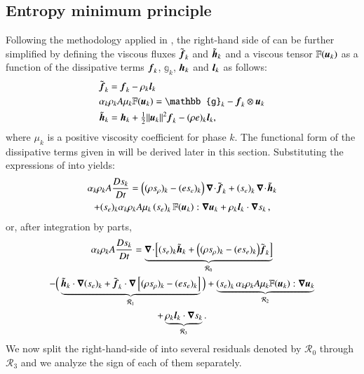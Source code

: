 \documentclass[preprint,10pt]{elsarticle}
\begin{document}
\subsection{Entropy minimum principle}\label{sct:end-min-pr}
%
Following the methodology applied in \cite{jlg, Marco_paper_low_mach}, the right-hand side of 
 can be further simplified by defining the viscous fluxes $\tilde{\boldsymbol f}_k$ and $\tilde{\boldsymbol h}_k$ and a viscous tensor  $\mathbb{F}(\boldsymbol u_k)$ as a function of the dissipative terms $\boldsymbol f_k$, $\mathbb{g}_k$, $\boldsymbol h_k$ and $\boldsymbol l_k$ as follows:
%
\begin{subequations}\label{eq:def-diss-terms-sect4}
\begin{align}
& \tilde{\mbold f}_k   =   \mbold f_k - \rho_k \mbold  l_k
  \\
&  \alpha_k \rho_k A \mu_k \mathbb{F}(\mbold u_k) =  \mathbb{g}_k -  \mbold f_k \otimes \mbold u_k
  \\
&  \tilde{\mbold h}_k =   \mbold h_k + \tfrac{1}{2}\| \mbold u_k\|^2  \mbold f_k - (\rho e)_k \mbold l_k,
\end{align}
\end{subequations}
%
where $\mu_k$ is a positive viscosity coefficient for phase $k$. The functional form of the dissipative terms given in  will be derived later in this section. Substituting the expressions of  into  yields:
%
\begin{multline}\label{eq:ent-res-7-eqn-diss-terms_rearranged2}
\alpha_k \rho_k A \frac{Ds_k}{Dt} 
=  \left( (\rho s_\rho)_k - (e s_e)_k \right) \boldsymbol\nabla\! \cdot \! \tilde{\boldsymbol f}_k 
+ \left(s_e\right)_k \boldsymbol\nabla\! \cdot \! \tilde{ \boldsymbol h} _k \\
+ (s_e)_k \alpha_k \rho_k A \mu_k  \left(s_e\right)_k \mathbb{F}(\boldsymbol u_k) : \boldsymbol\nabla \boldsymbol u_k 
+ \rho_k \boldsymbol l _k \cdot \boldsymbol\nabla s_k \,,
\end{multline}
%
or, after integration by parts,
%
\begin{multline}\label{eq:ent-res-7-eqn-diss-terms2}
\alpha_k \rho_k A \frac{Ds_k}{Dt} = 
\underbrace{\boldsymbol\nabla\! \cdot \! \left[ (s_e)_k\tilde{\boldsymbol h}_k +\Big( (\rho s_\rho)_k - (e s_e)_k \Big) \tilde{\boldsymbol f}_k \right]}_{{\mathcal{R}_0}} \\
-\Big(
\underbrace{\tilde{\boldsymbol h}_k \cdot \boldsymbol\nabla (s_e)_k + \tilde{\boldsymbol f}_k \cdot \boldsymbol\nabla \left[  (\rho s_\rho)_k - (e s_e)_k \right]}_{\mathcal{R}_1} 
\Big)
+ \underbrace{ \left(s_e\right)_k \alpha_k \rho_k A \mu_k \mathbb{F}(\boldsymbol u_k) : \boldsymbol\nabla \boldsymbol u_k}_{\mathcal{R}_2} \\
+ \underbrace{\rho_k \boldsymbol l _k \cdot \boldsymbol\nabla s_k}_{\mathcal{R}_3}.
\end{multline}
%
We now split the right-hand-side of  into several residuals denoted by $\mathcal{R}_0$ through $\mathcal{R}_3$ and we analyze the sign of each of them separately. 
\end{document}
